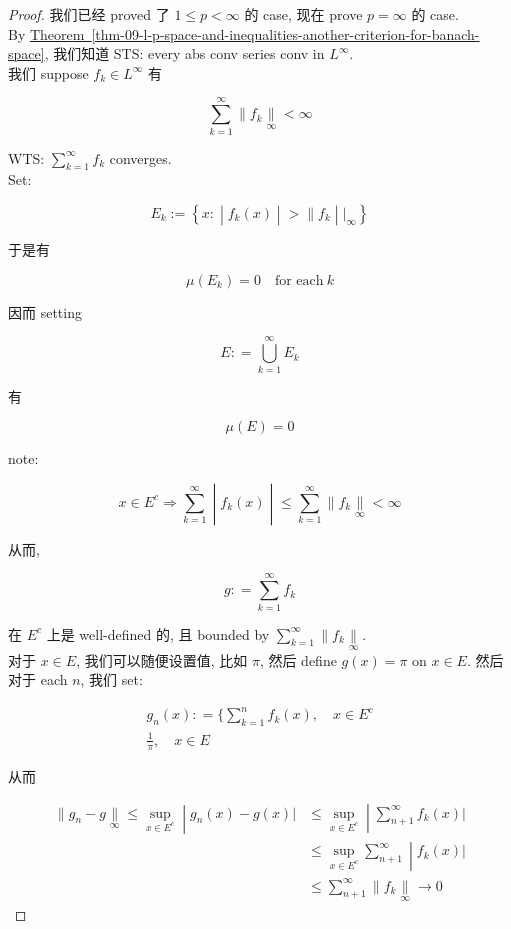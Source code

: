 \documentclass{qlnotes-export}
\begin{document}
\begin{proof}

我们已经 proved 了 \(1 \leq p < \infty\) 的 case, 现在 prove \(p = \infty\) 的 case.\\
By \hyperref[thm-09-l-p-space-and-inequalities-another-criterion-for-banach-space]{Theorem~\ref*{thm-09-l-p-space-and-inequalities-another-criterion-for-banach-space}}, 我们知道 STS: every abs conv series conv in \(L^{\infty}\).\\
我们 suppose \(f_{k} \in L^{\infty}\) 有

\[\sum\limits_{k = 1}^{\infty} \parallel f_{k}\underset{\infty}{\parallel} < \infty\]

WTS: \(\sum_{k = 1}^{\infty}f_{k}\) converges.\\
Set:

\[E_{k} := \left\{ x: \middle| f_{k}(x) \middle| > \parallel f_{k} \middle| |_{\infty} \right\}\]

于是有

\[\mu(E_{k}) = 0\quad\text{for each}\ k\]

因而 setting

\[E: = \bigcup\limits_{k = 1}^{\infty}E_{k}\]

有

\[\mu(E) = 0\]

note:

\[\left. x \in E^{c}\Longrightarrow\sum\limits_{k = 1}^{\infty} \middle| f_{k}(x) \middle| \leq \sum\limits_{k = 1}^{\infty} \parallel f_{k}\underset{\infty}{\parallel} < \infty \right.\]

从而,

\[g: = \sum\limits_{k = 1}^{\infty}f_{k}\]

在 \(E^{c}\) 上是 well-defined 的, 且 bounded by \(\sum_{k = 1}^{\infty} \parallel f_{k}\underset{\infty}{\parallel}\).\\
对于 \(x \in E\), 我们可以随便设置值, 比如 \(\pi\), 然后 define \(g(x) = \pi\) on \(x \in E\). 然后对于 each \(n\), 我们 set:

\[\begin{matrix}
{g_{n}(x): = \{\sum\limits_{k = 1}^{n}f_{k}(x),\quad x \in E^{c}} \\
{\frac{1}{\pi},\quad x \in E}
\end{matrix}\]

从而

\[\begin{matrix}
\left. \parallel g_{n} - g\underset{\infty}{\parallel} \leq \sup\limits_{x \in E^{c}} \middle| g_{n}(x) - g(x)| \right. & \left. \leq \sup\limits_{x \in E^{c}} \middle| \sum\limits_{n + 1}^{\infty}f_{k}(x)| \right. \\
 & \left. \leq \sup\limits_{x \in E^{c}}\sum\limits_{n + 1}^{\infty} \middle| f_{k}(x)| \right. \\
 & {\leq \sum\limits_{n + 1}^{\infty} \parallel f_{k}\underset{\infty}{\parallel}\rightarrow 0}
\end{matrix}\]

\end{proof}
\end{document}
